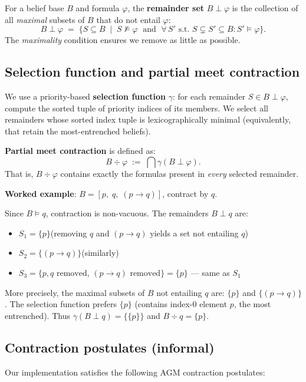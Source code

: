 \documentclass[11pt,a4paper]{article}
\newcommand{\entails}{\models}
\newcommand{\nentails}{\not\models}
\newcommand{\contraction}{\mathbin{\div}}
\begin{document}
For a belief base $B$ and formula $\varphi$, the \textbf{remainder set}
$B \perp \varphi$ is the collection of all \emph{maximal} subsets of $B$
that do not entail $\varphi$:
\[
  B \perp \varphi \;=\; \bigl\{ S \subseteq B \;\mid\;
    S \nentails \varphi \;\text{ and }\; \forall\, S' \text{ s.t. } S \subsetneq S' \subseteq B:
    S' \entails \varphi \bigr\}.
\]
The \emph{maximality} condition ensures we remove as little as possible.

\subsection{Selection function and partial meet contraction}

We use a priority-based \textbf{selection function} $\gamma$: for each remainder
$S \in B \perp \varphi$, compute the sorted tuple of priority indices of its
members.  We select all remainders whose sorted index tuple is lexicographically
minimal (equivalently, that retain the most-entrenched beliefs).

\textbf{Partial meet contraction} is defined as:
\[
  B \contraction \varphi \;:=\; \bigcap \gamma(B \perp \varphi).
\]
That is, $B \contraction \varphi$ contains exactly the formulas present in
\emph{every} selected remainder.

\textbf{Worked example}: $B = [p,\; q,\; (p \to q)]$, contract by $q$.

Since $B \entails q$, contraction is non-vacuous.
The remainders $B \perp q$ are:
\begin{itemize}[noitemsep]
  \item $S_1 = \{p\}$\quad (removing $q$ and $(p\to q)$ yields a set not entailing $q$)
  \item $S_2 = \{(p \to q)\}$\quad (similarly)
  \item $S_3 = \{p, q \text{ removed, }(p\to q) \text{ removed}\} = \{p\}$ — same as $S_1$
\end{itemize}
More precisely, the maximal subsets of $B$ not entailing $q$ are:
$\{p\}$ and $\{(p \to q)\}$.
The selection function prefers $\{p\}$ (contains index-0 element $p$, the most entrenched).
Thus $\gamma(B \perp q) = \{\{p\}\}$ and $B \contraction q = \{p\}$.

\subsection{Contraction postulates (informal)}

Our implementation satisfies the following AGM contraction postulates:
\end{document}

